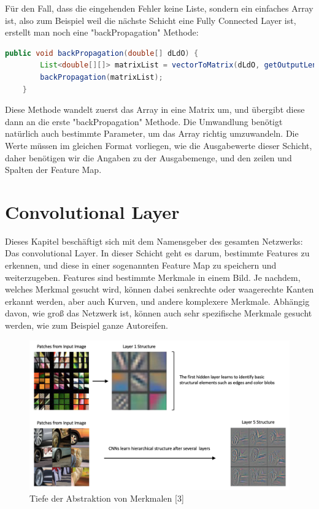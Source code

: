 \documentclass[12pt]{article}
\begin{document}
Für den Fall, dass die eingehenden Fehler keine Liste, sondern ein einfaches Array ist, also zum Beispiel weil die nächste Schicht eine Fully Connected Layer ist, erstellt man noch eine "backPropagation" Methode:

\begin{lstlisting}[language=Java]
    public void backPropagation(double[] dLdO) {
        List<double[][]> matrixList = vectorToMatrix(dLdO, getOutputLength(), getOutputRows(), getOutputCols());
        backPropagation(matrixList);
    }
\end{lstlisting}
Diese Methode wandelt zuerst das Array in eine Matrix um, und übergibt diese dann an die erste "backPropagation" Methode. Die Umwandlung benötigt natürlich auch bestimmte Parameter, um das Array richtig umzuwandeln. Die Werte müssen im gleichen Format vorliegen, wie die Ausgabewerte dieser Schicht, daher benötigen wir die Angaben zu der Ausgabemenge, und den zeilen und Spalten der Feature Map.

\cleardoublepage
\section{Convolutional Layer}
Dieses Kapitel beschäftigt sich mit dem Namensgeber des gesamten Netzwerks: Das convolutional Layer. 
In dieser Schicht geht es darum, bestimmte Features zu erkennen, und diese in einer sogenannten Feature Map zu speichern und weiterzugeben. Features sind bestimmte Merkmale in einem Bild. Je nachdem, welches Merkmal gesucht wird, können dabei senkrechte oder waagerechte Kanten erkannt werden, aber auch Kurven, und andere komplexere Merkmale. Abhängig davon, wie groß das Netzwerk ist, können auch sehr spezifische Merkmale gesucht werden, wie zum Beispiel ganze Autoreifen. 

\begin{figure}[H]
\centering
\includegraphics[scale=0.27]{./Images/003_tensorflow-keras-cnn-hierarchical-structure.png}
\caption{Tiefe der Abstraktion von Merkmalen [3]}
\label{Tiefe der Abstraktion von Merkmalen [3]}
\end{figure}
\end{document}
